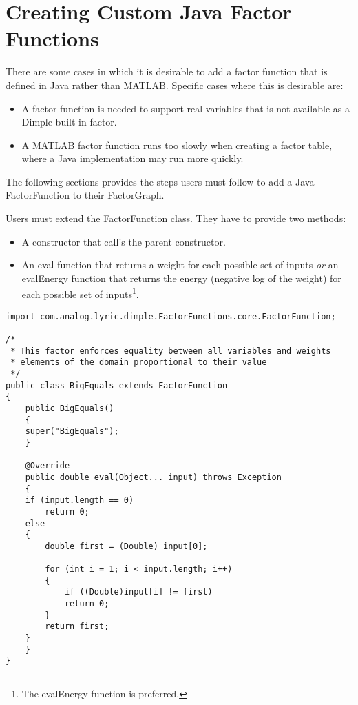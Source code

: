 \section{Creating Custom Java Factor Functions}
\label{sec:userJava}

There are some cases in which it is desirable to add a factor function that is defined in Java rather than MATLAB.  Specific cases where this is desirable are:

\begin{itemize}
\item A factor function is needed to support real variables that is not available as a Dimple built-in factor.
\item A MATLAB factor function runs too slowly when creating a factor table, where a Java implementation may run more quickly.
\end{itemize}

The following sections provides the steps users must follow to add a Java FactorFunction to their FactorGraph.

\label{sec:createJavaFactorFunction}

Users must extend the FactorFunction class. They have to provide two methods:

\begin{itemize}
\item A constructor that call's the parent constructor.
\item An eval function that returns a weight for each possible set of inputs \emph{or} an evalEnergy function that returns the energy (negative log of the weight) for each possible set of inputs\footnote{The evalEnergy function is preferred.}.
\end{itemize}

\begin{lstlisting}
import com.analog.lyric.dimple.FactorFunctions.core.FactorFunction;

/*
 * This factor enforces equality between all variables and weights
 * elements of the domain proportional to their value
 */
public class BigEquals extends FactorFunction
{	
    public BigEquals() 
    {
	super("BigEquals");
    }
  
    @Override
    public double eval(Object... input) throws Exception 
    {
	if (input.length == 0)
	    return 0;
	else
	{
	    double first = (Double) input[0];
	    
	    for (int i = 1; i < input.length; i++)
	    {
	        if ((Double)input[i] != first)
		    return 0;
	    }
	    return first;   
	}
    }
}
\end{lstlisting}

